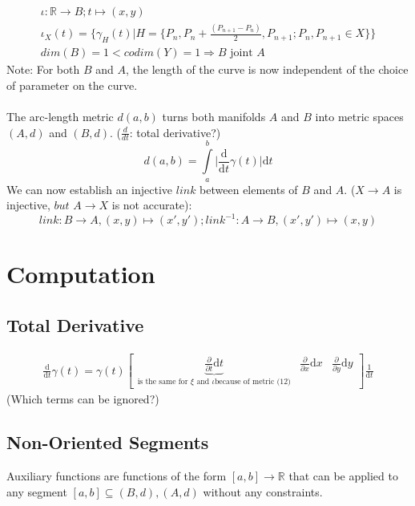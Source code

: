 \documentclass{article}
\begin{document}
\begin{align}
\iota: \mathbb{R} \rightarrow B; t \mapsto (x,y)\\
\iota_{X}(t) = \{ \gamma_{H}(t)\lvert H=\{P_{n},P_{n}+\frac{(P_{n+1}-P_{n})}{2},P_{n+1}; P_{n}, P_{n+1} \in X\}\}\\
dim(B)=1<codim(Y)=1 \Rightarrow B \text{ joint } A
\end{align}
Note: For both $B$ and $A$, the length of the curve is now independent of the choice of parameter on the curve. ~\cite[]{Taimanov}\\\\
The arc-length metric $d(a,b)$ turns both manifolds $A$ and $B$ into metric spaces $(A,d)$ and $(B,d)$. ($\frac{d}{dt}$: total derivative?)
\begin{equation}
d(a,b) = \int \limits _{a}^{b}\lvert \frac{\mathrm{d}}{\mathrm{d}t}\gamma(t)\rvert \mathrm{d}t
\end{equation}
We can now establish an injective $link$ between elements of $B$ and $A$. ($X \rightarrow A$ is injective, $but$ $A \rightarrow X$ is not accurate):
\begin{equation}
link: B \rightarrow A, (x,y) \mapsto (x',y'); link^{-1}: A \rightarrow B, (x',y') \mapsto (x,y)
\end{equation}
\section{Computation}

\subsection{Total Derivative}
\begin{align}
\frac{\mathrm{d}}{\mathrm{d} t} \gamma (t) = \gamma(t) \begin{bmatrix} \underbrace{\frac{\partial}{\partial t} \mathrm{d} t}_{\text{is the same for } \xi \text{ and } \iota \text{because of metric (12)}} & \frac{\partial}{\partial x}  \mathrm{d} x & \frac{\partial}{\partial y} \mathrm{d} y \end{bmatrix} \frac{1}{\mathrm{d}t}
\end{align}
(Which terms can be ignored?)

\subsection{Non-Oriented Segments}

Auxiliary functions are functions of the form $[a,b] \rightarrow \mathbb{R}$ that can be applied to any segment $[a,b] \subseteq (B,d),(A,d)$ without any constraints.
\end{document}
